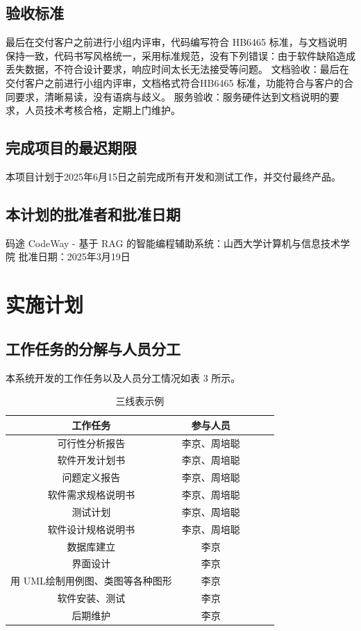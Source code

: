 \documentclass[
    report,     %
    oneside,    %
    UTF8,       %
    zihao=-4    %
]{config} %
\begin{document}
\subsection{验收标准}
最后在交付客户之前进行小组内评审，代码编写符合 HB6465 标准，与文档说明保持一致，代码书写风格统一，采用标准规范，没有下列错误：由于软件缺陷造成丢失数据，不符合设计要求，响应时间太长无法接受等问题。
文档验收：最后在交付客户之前进行小组内评审，文档格式符合HB6465 标准，功能符合与客户的合同要求，清晰易读，没有语病与歧义。
服务验收：服务硬件达到文档说明的要求，人员技术考核合格，定期上门维护。

\subsection{完成项目的最迟期限}
本项目计划于2025年6月15日之前完成所有开发和测试工作，并交付最终产品。
\subsection{本计划的批准者和批准日期}
码途 CodeWay - 基于 RAG 的智能编程辅助系统：山西大学计算机与信息技术学院
批准日期：2025年3月19日
\section{实施计划}
\subsection{工作任务的分解与人员分工}
本系统开发的工作任务以及人员分工情况如表 3 所示。
\begin{table}[H] %
    \centering %
    \caption{三线表示例} %
    \label{tab:three-line} %
    \renewcommand\arraystretch{0.85} %
    \setlength{\tabcolsep}{12pt} %
    \begin{tabular}{ccccc} %
        \toprule[1.5pt] %
        \textbf{工作任务} & \textbf{参与人员} \\ %
        \midrule[0.8pt] %
        可行性分析报告 & 李京、周培聪\\ 
软件开发计划书 & 李京、周培聪\\ 
问题定义报告 & 李京、周培聪\\ 
软件需求规格说明书 & 李京、周培聪\\ 
测试计划 & 李京、周培聪\\ 
软件设计规格说明书  & 李京、周培聪\\ 
数据库建立  & 李京\\ 
界面设计  & 李京\\ 
用 UML绘制用例图、类图等各种图形  & 李京\\ 
软件安装、测试 & 李京\\ 
后期维护  & 李京\\ 
        \hline\hline %
    \end{tabular}
\end{table}
\end{document}
